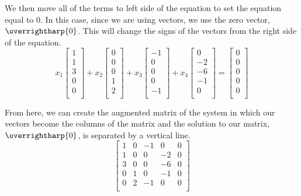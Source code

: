 \documentclass[10pt]{article}
\begin{document}
\begin{multicols}{2}
We then move all of the terms to left side of the equation to set the equation equal to 0. In this case, since we are using
vectors, we use the zero vector, $\overrightharp{0}$. This will change the signs of the vectors from the right side of the equation.
\[
x_{1} \left[ \begin{array}{c} 1 \\ 1 \\ 3 \\ 0 \\ 0 \\ \end{array} \right] + 
x_{2} \left[ \begin{array}{c} 0 \\ 0 \\ 0 \\ 1 \\ 2 \\ \end{array} \right] + 
x_{3} \left[ \begin{array}{c} -1 \\ 0 \\ 0 \\ 0 \\ -1 \\ \end{array} \right] +
x_{4} \left[ \begin{array}{c} 0 \\ -2 \\ -6 \\ -1 \\ 0 \\ \end{array} \right] =
\left[ \begin{array}{c} 0 \\ 0 \\ 0 \\ 0 \\ 0 \\ \end{array} \right]
\]

From here, we can create the augmented matrix of the system in which our vectors become the columns of the matrix and
the solution to our matrix, $\overrightharp{0}$, is separated by a vertical line.
\[
\left[
\begin{array}{cccc|c}
1 & 0 & -1 & 0 & 0 \\
1 & 0 & 0 & -2 & 0 \\
3 & 0 & 0 & -6 & 0 \\
0 & 1 & 0 & -1 & 0 \\
0 & 2 & -1 & 0 & 0 \\
\end{array}
\right]
\]


\end{multicols}
\end{document}
